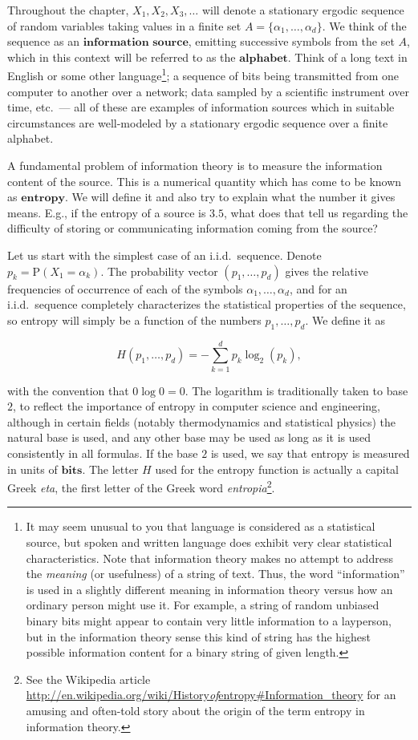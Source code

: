\documentclass[11pt]{report}
\theoremstyle{plain}
\theoremstyle{definition}
\begin{document}
Throughout the chapter, $X_1,X_2,X_3,\ldots$ will denote a stationary ergodic sequence of random variables taking values in a finite set $A=\{\alpha_1,\ldots,\alpha_d \}$. We think of the sequence as an $\textbf{information source}$, emitting successive symbols from the set $A$, which in this context will be referred to as the $\textbf{alphabet}$. Think of a long text in English or some other language\footnote{It may seem unusual to you that language is considered as a statistical source, but spoken and written language does exhibit very clear statistical characteristics. Note that information theory makes no attempt to address the \emph{meaning} (or usefulness) of a string of text. Thus, the word ``information'' is used in a slightly different meaning in information theory versus how an ordinary person might use it. For example, a string of random unbiased binary bits might appear to contain very little information to a layperson, but in the information theory sense this kind of string has the highest possible information content for a binary string of given length.}; a sequence of bits being transmitted from one computer to another over a network; data sampled by a scientific instrument over time, etc.\ --- all of these are examples of information sources which in suitable circumstances are well-modeled by a stationary ergodic sequence over a finite alphabet.

A fundamental problem of information theory is to measure the information content of the source. This is a numerical quantity which has come to be known as $\textbf{entropy}$. We will define it and also try to explain what the number it gives means. E.g., if the entropy of a source is $3.5$, what does that tell us regarding the difficulty of storing or communicating information coming from the source?

Let us start with the simplest case of an i.i.d.\ sequence. Denote $p_k = \mathrm{P}(X_1 = \alpha_k)$. The probability vector $(p_1,\ldots,p_d)$ gives the relative frequencies of occurrence of each of the symbols $\alpha_1,\ldots,\alpha_d$, and for an i.i.d.\ sequence completely characterizes the statistical properties of the sequence, so entropy will simply be a function of the numbers $p_1,\ldots,p_d$. We define it as

\[
H(p_1,\ldots,p_d) = -\sum_{k=1}^d p_k \log_2(p_k),
\]

with the convention that $0\log 0 = 0$. The logarithm is traditionally taken to base $2$, to reflect the importance of entropy in computer science and engineering, although in certain fields (notably thermodynamics and statistical physics) the natural base is used, and any other base may be used as long as it is used consistently in all formulas. If the base $2$ is used, we say that entropy is measured in units of $\textbf{bits}$. The letter $H$ used for the entropy function is actually a capital Greek \emph{eta}, the first letter of the Greek word \emph{entropia}\footnote{See the Wikipedia article \href{http://en.wikipedia.org/wiki/History_of_entropy\#Information_theory}{http://en.wikipedia.org/wiki/History\emph{of}entropy\#Information\_theory} for an amusing and often-told story about the origin of the term entropy in information theory.}.
\end{document}
